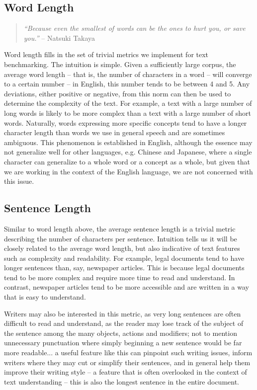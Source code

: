 \subsection{Word Length}
\begin{quote}
\textit{“Because even the smallest of words can be the ones to hurt you, or save you.”} -- Natsuki Takaya 
\end{quote}
Word length fills in the set of trivial metrics we implement for text benchmarking. The intuition is simple. Given a sufficiently large corpus, the average word length -- that is, the number of characters in a word -- will converge to a certain number -- in English, this number tends to be between 4 and 5. Any deviations, either positive or negative, from this norm can then be used to determine the complexity of the text. For example, a text with a large number of long words is likely to be more complex than a text with a large number of short words. Naturally, words expressing more specific concepts tend to have a longer character length than words we use in general speech and are sometimes ambiguous. This phenomenon is established in English, although the essence may not generalize well for other languages, e.g. Chinese and Japanese, where a single character can generalize to a whole word or a concept as a whole, but given that we are working in the context of the English language, we are not concerned with this issue.

\subsection{Sentence Length}
Similar to word length above, the average sentence length is a trivial metric describing the number of characters per sentence. Intuition tells us it will be closely related to the average word length, but also indicative of text features such as complexity and readability. For example, legal documents tend to have longer sentences than, say, newspaper articles. This is because legal documents tend to be more complex and require more time to read and understand. In contrast, newspaper articles tend to be more accessible and are written in a way that is easy to understand. 

Writers may also be interested in this metric, as very long sentences are often difficult to read and understand, as the reader may lose track of the subject of the sentence among the many objects, actions and modifiers; not to mention unnecessary punctuation where simply beginning a new sentence would be far more readable... a useful feature like this can pinpoint such writing issues, inform writers where they may cut or simplify their sentences, and in general help them improve their writing style -- a feature that is often overlooked in the context of text understanding -- this is also the longest sentence in the entire document.

